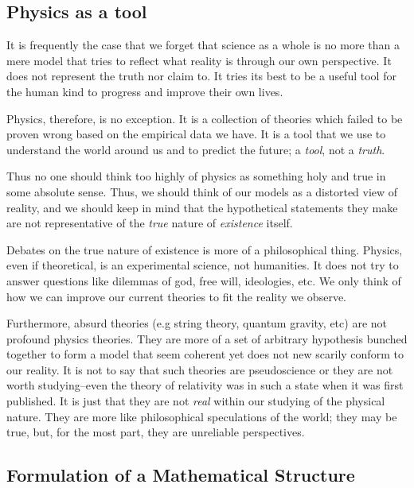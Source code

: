 
\subsection{Physics as a tool}%
\label{sub:physics}

It is frequently the case that we forget that science as a whole is no more than a mere model that tries to reflect what reality is through our own perspective. It does not represent the truth nor claim to. It tries its best to be a useful tool for the human kind to progress and improve their own lives.

Physics, therefore, is no exception. It is a collection of theories which failed to be proven wrong based on the empirical data we have. It is a tool that we use to understand the world around us and to predict the future; a \textit{tool}, not a \textit{truth}.

Thus no one should think too highly of physics as something holy and true in some absolute sense. Thus, we should think of our models as a distorted view of reality, and we should keep in mind that the hypothetical statements they make are not representative of the \textit{true} nature of \textit{existence} itself.

Debates on the true nature of existence is more of a philosophical thing. Physics, even if theoretical, is an experimental science, not humanities. It does not try to answer questions like dilemmas of god, free will, ideologies, etc. We only think of how we can improve our current theories to fit the reality we observe.

Furthermore, absurd theories (e.g string theory, quantum gravity, etc) are not profound physics theories. They are more of a set of arbitrary hypothesis bunched together to form a model that seem coherent yet does not new scarily conform to our reality. It is not to say that such theories are pseudoscience or they are not worth studying--even the theory of relativity was in such a state when it was first published. It is just that they are not \textit{real} within our studying of the physical nature. They are more like philosophical speculations of the world; they may be true, but, for the most part, they are unreliable perspectives.

\subsection{Formulation of a Mathematical Structure}
\label{sub_sec:sub_section_1}

